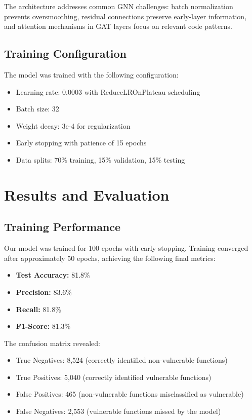 The architecture addresses common GNN challenges: batch normalization prevents oversmoothing, residual connections preserve early-layer information, and attention mechanisms in GAT layers focus on relevant code patterns.

\subsection{Training Configuration}

The model was trained with the following configuration:
\begin{itemize}
\item Learning rate: 0.0003 with Reduce\-LROn\-Plateau scheduling
\item Batch size: 32
\item Weight decay: 3e-4 for regularization
\item Early stopping with patience of 15 epochs
\item Data splits: 70\% training, 15\% validation, 15\% testing
\end{itemize}

\section{Results and Evaluation}
\label{sec:results}

\subsection{Training Performance}

Our model was trained for 100 epochs with early stopping. Training converged after approximately 50 epochs, achieving the following final metrics:

\begin{itemize}
\item \textbf{Test Accuracy:} 81.8\%
\item \textbf{Precision:} 83.6\% 
\item \textbf{Recall:} 81.8\%
\item \textbf{F1-Score:} 81.3\%
\end{itemize}

The confusion matrix revealed:
\begin{itemize}
\item True Negatives: 8,524 (correctly identified non-vulnerable functions)
\item True Positives: 5,040 (correctly identified vulnerable functions)  
\item False Positives: 465 (non-vulnerable functions misclassified as vulnerable)
\item False Negatives: 2,553 (vulnerable functions missed by the model)
\end{itemize}


